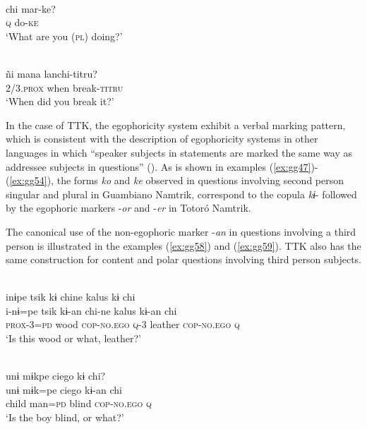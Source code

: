 \documentclass[output=paper]{langsci/langscibook}
\begin{document}
\ea \label{ex:gg56}
\\
	\gll chi	mar-ke?\\
	\textsc{q} do-\textsc{ke}\\
	\glt ‘What are you (\textsc{pl}) doing?’
\z

\ea \label{ex:gg57}
\\
	\gll ñi	mana	lanchi-titru?\\
	2/3.\textsc{prox} when break-\textsc{titru}\\
	\glt ‘When did you break it?’
\z

In the case of TTK, the egophoricity system exhibit a verbal marking pattern, which is consistent with the description of egophoricity systems in other languages in which “speaker subjects in statements are marked the same way as addressee subjects in questions” (\citealt{Curnow2002a}). As is shown in examples (\ref{ex:gg47})-(\ref{ex:gg54}), the forms \textit{ko} and \textit{ke} observed in questions involving second person singular and plural in Guambiano Namtrik, correspond to the copula \textit{kɨ}- followed by the egophoric markers -\textit{or} and -\textit{er} in Totoró Namtrik. 

The canonical use of the non-egophoric marker -\textit{an} in questions involving a third person is illustrated in the examples (\ref{ex:gg58}) and (\ref{ex:gg59}). TTK also has the same construction for content and polar questions involving third person subjects.


\ea \label{ex:gg58}
\\
	\glll inɨpe tsik kɨ chine kalus kɨ chi\\
	i-nɨ=pe	tsik	kɨ-an	chi-ne	kalus	kɨ-an	chi\\
	\textsc{prox-3=pd}	wood	\textsc{cop-no.ego}	\textsc{q-3}	leather	\textsc{cop-no.ego}	\textsc{q}\\
	\glt ‘Is this wood or what, leather?’
\z



\ea \label{ex:gg59}
\\
	\glll unɨ mɨkpe ciego kɨ chi?\\
	unɨ	mɨk=pe	ciego	kɨ-an	chi\\
	child	man=\textsc{pd}	blind	\textsc{cop-no.ego}	\textsc{q}\\
	\glt ‘Is the boy blind, or what?’
\z
\end{document}
